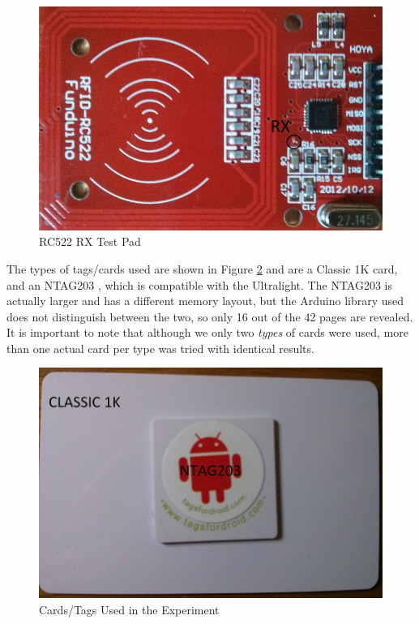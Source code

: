 \documentclass[fleqn,10pt]{SelfArx} %
\begin{document}
\begin{figure}[h]
  \includegraphics[width=\linewidth]{img/rc522pic}
  \caption{RC522 RX Test Pad}
  \label{fig:rc522pic}
\end{figure}


The types of tags/cards used are shown in Figure \ref{fig:cards} and are a Classic 1K card, and an NTAG203 \cite{ntag203}, which is compatible with the Ultralight. The NTAG203 is actually larger and has a different memory layout, but the Arduino library used does not distinguish between the two, so only 16 out of the 42 pages are revealed. It is important to note that although we only two {\em types} of cards were used, more than one actual card per type was tried with identical results.

\begin{figure}[h]
  \includegraphics[width=\linewidth]{img/cards}
  \caption{Cards/Tags Used in the Experiment}
  \label{fig:cards}
\end{figure}
\end{document}
